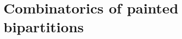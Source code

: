 \documentclass[12pt,a4paper]{amsart}
\newcommand{\trivial}[2][]{\if\relax\detokenize{#1}\relax
  {%
      \color{orange} \vspace{0em} $[$  #2 $]$
      \color{black}
  }
  \else
\ifx#1h
\ifcsname showtrivial\endcsname
{%
    \color{orange} \vspace{0em}  $[$ #2 $]$
    \color{black}
}
\fi
\else {\red Wrong argument!} \fi
\fi
}
\newcommand{\CK}{{\mathcal {K}}}
\numberwithin{equation}{section}
\theoremstyle{remark}
\def\lamck{\lambda_\ckcO}
\def\Coh{\mathrm{Coh}}
\def\ev#1{{\mathrm{ev}_{#1}}}
\newcommand{\Grt}{\cK}
\begin{document}



%




\section{Combinatorics of painted bipartitions}
\end{document}
